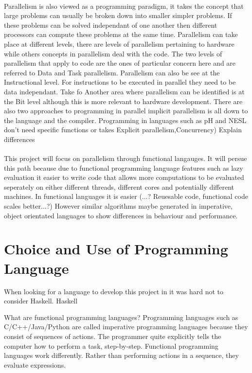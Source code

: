 \documentclass{report}
\begin{document}
\paragraph{}
Parallelism is also viewed as a programming paradigm, it takes the concept that large problems can usually be broken down into smaller simpler problems. If these problems can be solved independant of one another then different processors can compute these problems at the same time. Parallelism can take place at different levels, there are levels of parallelism pertaining to hardware while others concepts in parallelism deal with the code. The two levels of parallelism that apply to code are the ones of particular concern here and are referred to Data and Task parallelism. Parallelism can also be see at the Instructional level. For instructions to be executed in parallel they need to be data independant. Take fo  Another area where parallelism can be identified is at the Bit level although this is more relevant to hardware development. There are also two approaches to programming in parallel implicit parallelism is all down to the language and the compiler. Programming in languages such as pH and NESL don't need specific functions or  takes Explicit parallelism,Concurrency) Explain differences

\paragraph{}
This project will focus on parallelism through functional langauges. It will persue this path because due to functional programming language features such as lazy evaluation it easier to write code that allows more computations to be evaluated seperately on either different threads, different cores and potentially different machines. In functional languages it is easier (...? Reuesable code, functional code scales better...?) However similar algorithms maybe generated in imperative, object orientated languages to show differences in behaviour and performance. 

\section{Choice and Use of Programming Language}

When looking for a language to develop this project in it was hard not to consider Haskell. Haskell

%

What are functional programming languages?
Programming languages such as C/C++/Java/Python are called imperative programming languages because they consist of sequences of actions. The programmer quite explicitly tells the computer how to perform a task, step-by-step. Functional programming languages work differently. Rather than performing actions in a sequence, they evaluate expressions.
\end{document}

